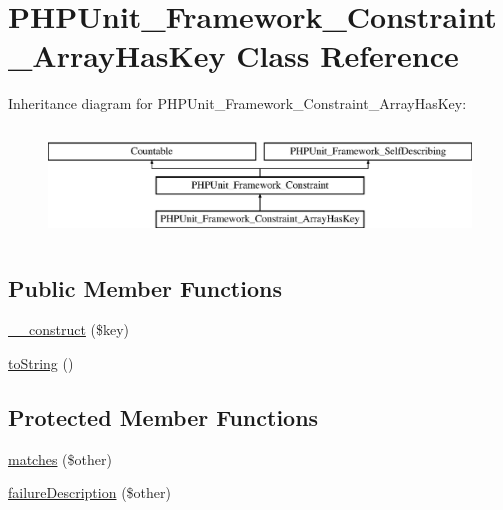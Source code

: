 \hypertarget{class_p_h_p_unit___framework___constraint___array_has_key}{}\section{P\+H\+P\+Unit\+\_\+\+Framework\+\_\+\+Constraint\+\_\+\+Array\+Has\+Key Class Reference}
\label{class_p_h_p_unit___framework___constraint___array_has_key}
Inheritance diagram for P\+H\+P\+Unit\+\_\+\+Framework\+\_\+\+Constraint\+\_\+\+Array\+Has\+Key\+:\begin{figure}[H]
\begin{center}
\leavevmode
\includegraphics[height=2.957747cm]{class_p_h_p_unit___framework___constraint___array_has_key}
\end{center}
\end{figure}
\subsection*{Public Member Functions}
\begin{DoxyCompactItemize}
\item 
\mbox{\hyperlink{class_p_h_p_unit___framework___constraint___array_has_key_ae68e3281fdc4689e22a68b4b463c5fa9}{\+\_\+\+\_\+construct}} (\$key)
\item 
\mbox{\hyperlink{class_p_h_p_unit___framework___constraint___array_has_key_a5558c5d549f41597377fa1ea8a1cefa3}{to\+String}} ()
\end{DoxyCompactItemize}
\subsection*{Protected Member Functions}
\begin{DoxyCompactItemize}
\item 
\mbox{\hyperlink{class_p_h_p_unit___framework___constraint___array_has_key_a9c9c337de483bbdbb9fa249a6c7c9cc5}{matches}} (\$other)
\item 
\mbox{\hyperlink{class_p_h_p_unit___framework___constraint___array_has_key_aaabb679273bfb812df4d81c283754a59}{failure\+Description}} (\$other)
\end{DoxyCompactItemize}
